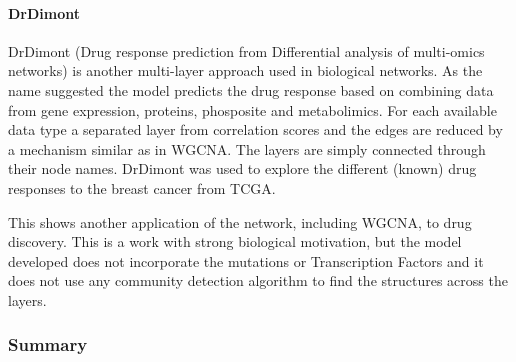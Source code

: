 \paragraph*{DrDimont} \label{s:lit:drDimont}

DrDimont (Drug response prediction from Differential analysis of multi-omics networks) \citet{Hiort2022-lk} is another multi-layer approach used in biological networks. As the name suggested the model predicts the drug response based on combining data from gene expression, proteins, phosposite and metabolimics. For each available data type a separated layer from correlation scores and the edges are reduced by a mechanism similar as in WGCNA. The layers are simply connected through their node names. DrDimont was used to explore the different (known) drug responses to the breast cancer from TCGA.

This shows another application of the network, including WGCNA, to drug discovery. This is a work with strong biological motivation, but the model developed does not incorporate the mutations or Transcription Factors and it does not use any community detection algorithm to find the structures across the layers.

\subsubsection{Summary}
